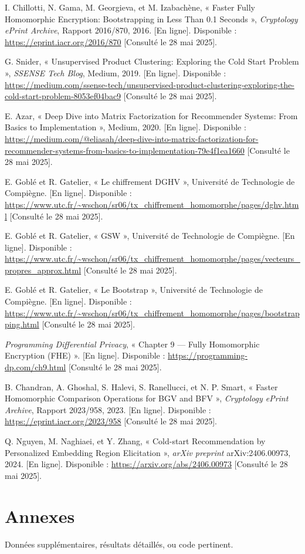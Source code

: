\documentclass{article}
\begin{document}
\begin{thebibliography}{99}
I. Chillotti, N. Gama, M. Georgieva, et M. Izabachène, « Faster Fully Homomorphic Encryption: Bootstrapping in Less Than 0.1 Seconds », \emph{Cryptology ePrint Archive}, Rapport 2016/870, 2016. [En ligne]. Disponible : \url{https://eprint.iacr.org/2016/870} [Consulté le 28 mai 2025].

G. Snider, « Unsupervised Product Clustering: Exploring the Cold Start Problem », \emph{SSENSE Tech Blog}, Medium, 2019. [En ligne]. Disponible : \url{https://medium.com/ssense-tech/unsupervised-product-clustering-exploring-the-cold-start-problem-8053ef04bac9} [Consulté le 28 mai 2025].

E. Azar, « Deep Dive into Matrix Factorization for Recommender Systems: From Basics to Implementation », Medium, 2020. [En ligne]. Disponible : \url{https://medium.com/@eliasah/deep-dive-into-matrix-factorization-for-recommender-systems-from-basics-to-implementation-79e4f1ea1660} [Consulté le 28 mai 2025].

E. Goblé et R. Gatelier, « Le chiffrement DGHV », Université de Technologie de Compiègne. [En ligne]. Disponible : \url{https://www.utc.fr/~wschon/sr06/tx_chiffrement_homomorphe/pages/dghv.html} [Consulté le 28 mai 2025].

E. Goblé et R. Gatelier, « GSW », Université de Technologie de Compiègne. [En ligne]. Disponible : \url{https://www.utc.fr/~wschon/sr06/tx_chiffrement_homomorphe/pages/vecteurs_propres_approx.html} [Consulté le 28 mai 2025].

E. Goblé et R. Gatelier, « Le Bootstrap », Université de Technologie de Compiègne. [En ligne]. Disponible : \url{https://www.utc.fr/~wschon/sr06/tx_chiffrement_homomorphe/pages/bootstrapping.html} [Consulté le 28 mai 2025].

\emph{Programming Differential Privacy}, « Chapter 9 — Fully Homomorphic Encryption (FHE) ». [En ligne]. Disponible : \url{https://programming-dp.com/ch9.html} [Consulté le 28 mai 2025].

B. Chandran, A. Ghoshal, S. Halevi, S. Ranellucci, et N. P. Smart, « Faster Homomorphic Comparison Operations for BGV and BFV », \emph{Cryptology ePrint Archive}, Rapport 2023/958, 2023. [En ligne]. Disponible : \url{https://eprint.iacr.org/2023/958} [Consulté le 28 mai 2025].

Q. Nguyen, M. Naghiaei, et Y. Zhang, « Cold-start Recommendation by Personalized Embedding Region Elicitation », \emph{arXiv preprint} arXiv:2406.00973, 2024. [En ligne]. Disponible : \url{https://arxiv.org/abs/2406.00973} [Consulté le 28 mai 2025].

\end{thebibliography}

\section*{Annexes}
Données supplémentaires, résultats détaillés, ou code pertinent.
\end{document}
